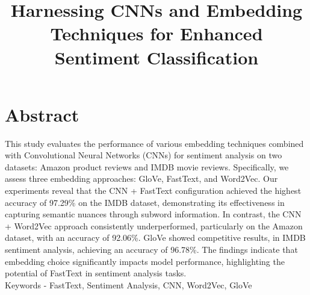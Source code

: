 \documentclass[10pt,a4paper]{article}
\date{}
\title{\textbf{Harnessing CNNs and Embedding Techniques for Enhanced
Sentiment Classification}}
\begin{document}

\maketitle

\section*{Abstract}

This study evaluates the performance of various embedding techniques combined with Convolutional Neural Networks (CNNs) for sentiment analysis on two datasets: Amazon product reviews and IMDB movie reviews. Specifically, we assess three embedding approaches: GloVe, FastText, and Word2Vec.
Our experiments reveal that the CNN + FastText configuration achieved the highest accuracy of 97.29\% on the IMDB dataset, demonstrating its effectiveness in capturing semantic nuances through subword information. In contrast, the CNN + Word2Vec approach consistently underperformed, particularly on the Amazon dataset, with an accuracy of 92.06\%. GloVe showed competitive results, in IMDB sentiment analysis, achieving an accuracy of 96.78\%. The findings indicate that embedding choice significantly impacts model performance, highlighting the potential of FastText in sentiment analysis tasks.\\
Keywords - FastText, Sentiment Analysis, CNN, Word2Vec, GloVe
\\[8pt]
\end{document}
